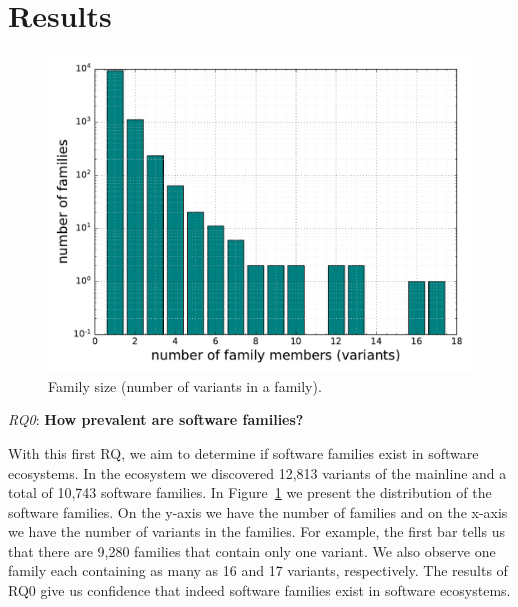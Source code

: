 \section{Results}
\label{sec:results}
\begin{figure}[htbp]
\vspace{-.3cm}
   \centering
    \includegraphics[scale=0.4]{figures/variants.pdf}
    \caption{Family size (number of variants in a family).}
    \label{fig:variants}
\end{figure}

\noindent
\textit{RQ0}: \textbf{How prevalent are software families?}

With this first RQ, we aim to determine if software families exist in software ecosystems. In the \js ecosystem we discovered 12,813 variants of the mainline and a total of 10,743 software families. In Figure~\ref{fig:variants} we present the distribution of the software families. On the y-axis we have the number of families and on the x-axis we have the number of variants in the families. For example, the first bar tells us that there are 9,280 families that contain only one variant. We also observe one family each containing as many as 16 and 17 variants, respectively. The results of RQ0 give us confidence that indeed software families exist in software ecosystems.

